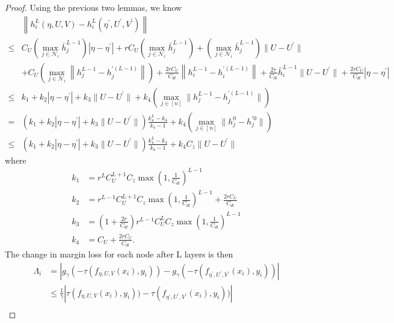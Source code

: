 \begin{proof}
    Using the previous two lemmas, we know
    \begin{align*}
        &\left\|h_i^{L}(\eta, U, V) - h_i^{L}(\eta^\prime, U^\prime, V^\prime)\right\|\\
        \leq &C_U \left(\max_{j \in \mathcal{N}_i}\bar h_j^{L-1}\right) |\eta - \eta^\prime|
        +  rC_U \left(\max_{j \in \mathcal{N}_i}\bar h_j^{L-1}\right)
        + \left(\max_{j \in \mathcal{N}_i}\bar h_j^{L-1}\right) \|U - U^{\prime}\| \\
        &+ C_U \left(\max_{j \in \mathcal{N}_i}\left\|h_j^{L-1} - h_j^{\prime (L-1)}\right\|\right)
        + \frac{2rC_U}{C_{dl}}\left\|h_i^{L-1} - h_i^{\prime (L-1)}\right\|
        + \frac{2r}{C_{dl}} \bar h_i^{L-1} \|U - U^{\prime}\| + \frac{2rC_U}{C_{dl}}|\eta - \eta^\prime|\\
        \leq & k_1 + k_2|\eta-\eta^\prime| + k_3 \|U - U^{\prime}\| + k_4 \left(\max_{j \in [n]}\|h_j^{L-1} - h_j^{\prime (L-1)}\|\right)
        \\
        =& \left(k_1 + k_2|\eta-\eta^\prime| + k_3 \|U - U^{\prime}\|\right) \frac{k_4^L - k_4}{k_4 - 1} + k_4 \left(\max_{j \in [n]}\|h^0_j - h_j^{\prime 0}\|\right)\\
        \leq & \left(k_1 + k_2|\eta-\eta^\prime| + k_3 \|U - U^{\prime}\|\right) \frac{k_4^L - k_4}{k_4 - 1} + k_4 C_z \|U - U^\prime\|
    \end{align*}
    where 
    \begin{align*}
        k_1 &= r^L C_U^{L+1} C_z \max\left(1, \frac{1}{C_{dl}}\right)^{L-1}\\
        k_2 &= r^{L-1} C_U^{L+1} C_z \max\left(1, \frac{1}{C_{dl}}\right)^{L-1} + \frac{2rC_U}{C_{dl}}\\
        k_3 &= \left(1 + \frac{2r}{C_{dl}}\right)r^{L-1} C_U^{L} C_z \max\left(1, \frac{1}{C_{dl}}\right)^{L-1}\\
        k_4 &= C_U + \frac{2rC_U}{C_{dl}}.
    \end{align*}
    The change in margin loss for each node after L layers is then
    \begin{align*}
        \Lambda_i 
        &= \left|g_\gamma(-\tau (f_{\eta, U,V}(x_i), y_i)) - g_\gamma(-\tau (f_{\eta^\prime, U^\prime,V^\prime}(x_i), y_i))\right|\\
        &\leq \frac{1}{\gamma}\left|\tau (f_{\eta, U,V}(x_i), y_i)) - \tau (f_{\eta^\prime, U^\prime,V^\prime}(x_i), y_i))\right|
        \tag{since $g_\gamma$ is $1/\gamma$-Lipschitz}\\

\end{align*}
\end{proof}
